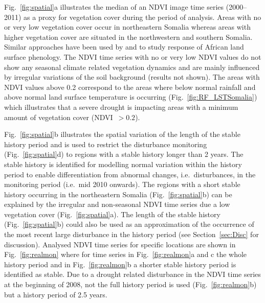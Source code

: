 \documentclass[authoryear,preprint,review,10pt]{elsarticle}
\begin{document}
Fig.~\ref{fig:spatial}a illustrates the median of an NDVI image time series (2000--2011) as a proxy for vegetation cover during the period of analysis. Areas with no or very low vegetation cover occur in northeastern Somalia whereas areas with higher vegetation cover are situated in the northwestern and southern Somalia. Similar approaches have been used by \citet{Brown:2010fq} and \citet{Vrieling:2011da} to study response of African land surface phenology. The NDVI time series with no or very low NDVI values do not show any seasonal climate related vegetation dynamics and are mainly influenced by irregular variations of the soil background (results not shown). The areas with NDVI values above 0.2 correspond to the areas where below normal rainfall and above normal land surface temperature is occurring (Fig.~\ref{fig:RF_LSTSomalia}) which illustrates that a severe drought is impacting areas with a minimum amount of vegetation cover (NDVI~$> 0.2$). 

Fig.~\ref{fig:spatial}b illustrates the spatial variation of the length of the stable history period and is used to restrict the disturbance monitoring (Fig.~\ref{fig:spatial}d) to regions with a stable history longer than 2 years. The stable history is identified for modelling normal variation within the history period to enable differentiation from abnormal changes, i.e.\ disturbances, in the monitoring period (i.e.\ mid 2010 onwards). The regions with a short stable history occurring in the northeastern Somalia (Fig.~\ref{fig:spatial}b) can be explained by the irregular and non-seasonal NDVI time series due a low vegetation cover (Fig.~\ref{fig:spatial}a). The length of the stable history (Fig.~\ref{fig:spatial}b) could also be used as an approximation of the occurrence of the most recent large disturbance in the history period (see Section~\ref{sec:Disc} for discussion). Analysed NDVI time series for specific locations are shown in Fig.~\ref{fig:realmon} where for time series in Fig.~\ref{fig:realmon}a and c the whole history period and in Fig.~\ref{fig:realmon}b a shorter stable history period is identified as stable. Due to a drought related disturbance in the NDVI time series at the beginning of 2008, not the full history period is used (Fig.~\ref{fig:realmon}b) but a history period of 2.5 years. 

\end{document}
